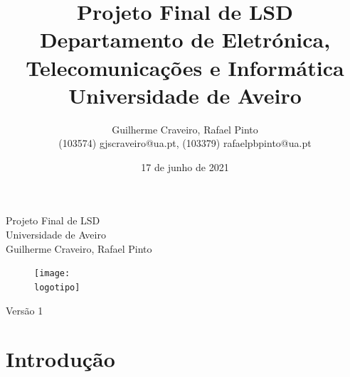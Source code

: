 \documentclass{report}
\begin{document}
%
\def\titulo{Projeto Final de LSD }
\def\data{17 de junho de 2021}
\def\autores{Guilherme Craveiro, Rafael Pinto}
\def\autorescontactos{(103574) gjscraveiro@ua.pt, (103379) rafaelpbpinto@ua.pt}
\def\versao{Versão 1}
\def\departamento{Departamento de Eletrónica, Telecomunicações e Informática}
\def\empresa{Universidade de Aveiro}
\def\logotipo{ua.pdf}
%
%
\renewcommand{\contentsname}{Índice}
\begin{titlepage}

\begin{center}
%
\vspace*{50mm}
%
{\Huge \titulo}\\ 
%
\vspace{10mm}
%
{\Large \empresa}\\
%
\vspace{10mm}
%
{\LARGE \autores}\\ 
%
\vspace{30mm}
%
\begin{figure}[h]
\center
\texttt{[image: \\logotipo]}
\end{figure}
%
\vspace{30mm}
\end{center}
%
\begin{flushright}
\versao
\end{flushright}
\end{titlepage}

\title{%
{\Huge\textbf{\titulo}}\\
{\Large \departamento\\ \empresa}
}
%
\author{%
    \autores \\
    \autorescontactos
}
%
\date{\data}
%
\maketitle


\tableofcontents


\clearpage
{}

\chapter{Introdução}
\label{chap.introducao}
\end{document}
